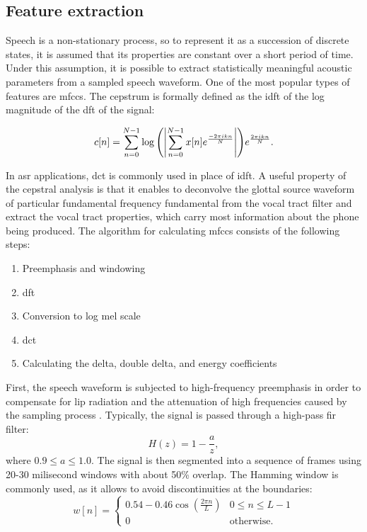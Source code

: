 \subsection{Feature extraction}
\label{subsection:features}
Speech is a non-stationary process, so to represent it as a succession of discrete states, it is assumed that its properties are constant over a short period of time. Under this assumption, it is possible to extract statistically meaningful acoustic parameters from a sampled speech waveform. One of the most popular types of features are \glspl{mfcc}. The cepstrum is formally defined as the \gls{idft} of the log magnitude of the \gls{dft} of the signal: 

\begin{equation}
	\label{equation:cepstrum}
	c[n]=\sum_{n=0}^{N-1}\log{\left(\left|\sum_{n=0}^{N-1}x[n]e^{\frac{-2\pi ikn}{N}}\right|\right)}e^{\frac{2\pi ikn}{N}}.
\end{equation}

In \gls{asr} applications, \gls{dct} is commonly used in place of \gls{idft}. A useful property of the cepstral analysis is that it enables to deconvolve the glottal source waveform of particular fundamental frequency \gls{fundamental} from the vocal tract filter and extract the vocal tract properties, which carry most information about the phone being produced. The algorithm for calculating \glspl{mfcc} consists of the following steps:
\begin{enumerate}
	\item Preemphasis and windowing
	\item \gls{dft}
	\item Conversion to log mel scale 
	\item \gls{dct}
	\item Calculating the delta, double delta, and energy coefficients
\end{enumerate}

First, the speech waveform is subjected to high-frequency preemphasis in order to compensate for lip radiation and the attenuation of high frequencies caused by the sampling process \cite{singh2012preprocessing}. Typically, the signal is passed through a high-pass \gls{fir} filter:
\begin{equation}
H(z)=1-\frac{a}{z},
\end{equation}
where $0.9 \leq a \leq 1.0$. The signal is then segmented into a sequence of frames using 20-30 milisecond windows with about 50\% overlap. The Hamming window is commonly used, as it allows to avoid discontinuities at the boundaries:
\begin{equation}
\label{equation:hamming}
  w[n]=
  \begin{cases}
    0.54-0.46\cos(\frac{2 \pi n}{L}) & 0 \leq n \leq L-1 \\
    0                               & \text{otherwise.}
  \end{cases}
\end{equation}

